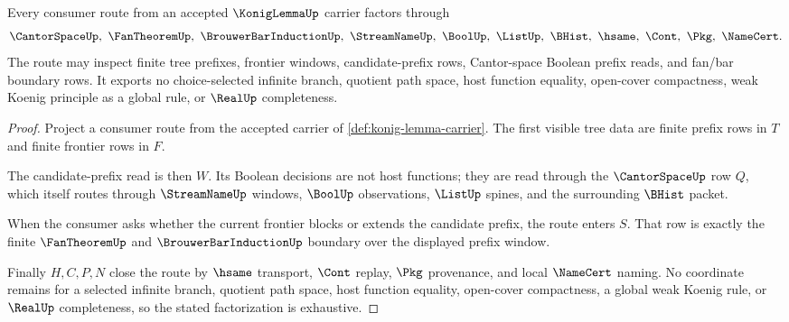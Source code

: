 \begin{theorem}
\label{thm:konig-lemma-cantor-fan-boundary}
Every consumer route from an accepted $\KonigLemmaUp$ carrier factors through
$$
\CantorSpaceUp,\ \FanTheoremUp,\ \BrouwerBarInductionUp,\ \StreamNameUp,\ \BoolUp,\ \ListUp,\ \BHist,\ \hsame,\ \Cont,\ \Pkg,\ \NameCert .
$$
The route may inspect finite tree prefixes, frontier windows, candidate-prefix rows, Cantor-space Boolean prefix reads, and fan/bar boundary rows. It exports no choice-selected infinite branch, quotient path space, host function equality, open-cover compactness, weak Koenig principle as a global rule, or $\RealUp$ completeness.
\end{theorem}
\begin{proof}
Project a consumer route from the accepted carrier of \autoref{def:konig-lemma-carrier}. The first visible tree data are finite prefix rows in $T$ and finite frontier rows in $F$.

The candidate-prefix read is then $W$. Its Boolean decisions are not host functions; they are read through the $\CantorSpaceUp$ row $Q$, which itself routes through $\StreamNameUp$ windows, $\BoolUp$ observations, $\ListUp$ spines, and the surrounding $\BHist$ packet.

When the consumer asks whether the current frontier blocks or extends the candidate prefix, the route enters $S$. That row is exactly the finite $\FanTheoremUp$ and $\BrouwerBarInductionUp$ boundary over the displayed prefix window.

Finally $H,C,P,N$ close the route by $\hsame$ transport, $\Cont$ replay, $\Pkg$ provenance, and local $\NameCert$ naming. No coordinate remains for a selected infinite branch, quotient path space, host function equality, open-cover compactness, a global weak Koenig rule, or $\RealUp$ completeness, so the stated factorization is exhaustive.
\end{proof}


